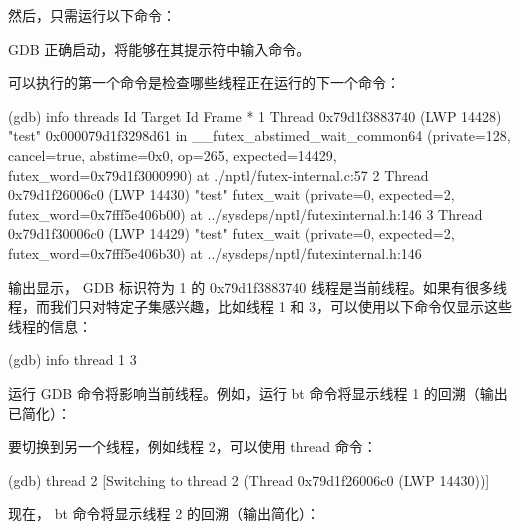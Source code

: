 然后，只需运行以下命令：


GDB 正确启动，将能够在其提示符中输入命令。

可以执行的第一个命令是检查哪些线程正在运行的下一个命令：

\begin{shell}
(gdb) info threads
Id Target Id Frame
* 1 Thread 0x79d1f3883740 (LWP 14428) "test" 0x000079d1f3298d61 in
__futex_abstimed_wait_common64 (private=128, cancel=true, abstime=0x0,
op=265, expected=14429, futex_word=0x79d1f3000990)
at ./nptl/futex-internal.c:57
2 Thread 0x79d1f26006c0 (LWP 14430) "test" futex_wait (private=0,
expected=2, futex_word=0x7fff5e406b00) at ../sysdeps/nptl/futexinternal.h:146
3 Thread 0x79d1f30006c0 (LWP 14429) "test" futex_wait (private=0,
expected=2, futex_word=0x7fff5e406b30) at ../sysdeps/nptl/futexinternal.h:146
\end{shell}

输出显示， GDB 标识符为 1 的 0x79d1f3883740 线程是当前线程。如果有很多线程，而我们只对特定子集感兴趣，比如线程 1 和 3，可以使用以下命令仅显示这些线程的信息：

\begin{shell}
(gdb) info thread 1 3
\end{shell}

运行 GDB 命令将影响当前线程。例如，运行 bt 命令将显示线程 1 的回溯（输出已简化）：


要切换到另一个线程，例如线程 2，可以使用 thread 命令：

\begin{shell}
(gdb) thread 2
[Switching to thread 2 (Thread 0x79d1f26006c0 (LWP 14430))]
\end{shell}

现在， bt 命令将显示线程 2 的回溯（输出简化）：


